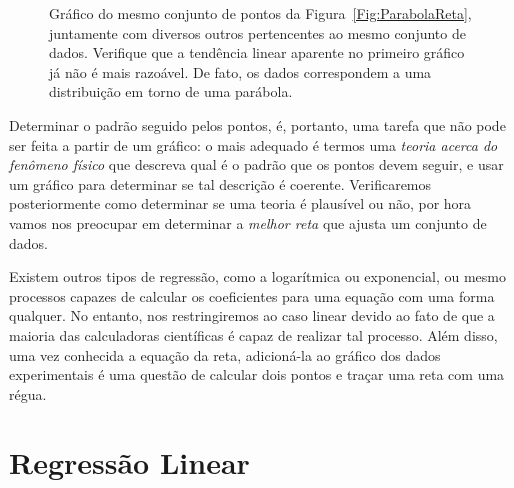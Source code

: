 \begin{figure*}
\centering
\forceversofloat
\caption{Gráfico do mesmo conjunto de pontos da Figura~\ref{Fig:ParabolaReta}, juntamente com diversos outros pertencentes ao mesmo conjunto de dados. Verifique que a tendência linear aparente no primeiro gráfico já não é mais razoável. De fato, os dados correspondem a uma distribuição em torno de uma parábola.}
\label{Fig:ParabolaReta2}

\end{figure*}

Determinar o padrão seguido pelos pontos, é, portanto, uma tarefa que não pode ser feita a partir de um gráfico: o mais adequado é termos uma \emph{teoria acerca do fenômeno físico} que descreva qual é o padrão que os pontos devem seguir, e usar um gráfico para determinar se tal descrição é coerente. Verificaremos posteriormente como determinar se uma teoria é plausível ou não, por hora vamos nos preocupar em determinar a \emph{melhor reta} que ajusta um conjunto de dados.

Existem outros tipos de regressão, como a logarítmica ou exponencial, ou mesmo processos capazes de calcular os coeficientes para uma equação com uma forma qualquer. No entanto, nos restringiremos ao caso linear devido ao fato de que a maioria das calculadoras científicas é capaz de realizar tal processo. Além disso, uma vez conhecida a equação da reta, adicioná-la ao gráfico dos dados experimentais é uma questão de calcular dois pontos e traçar uma reta com uma régua.%

\section{Regressão Linear}

